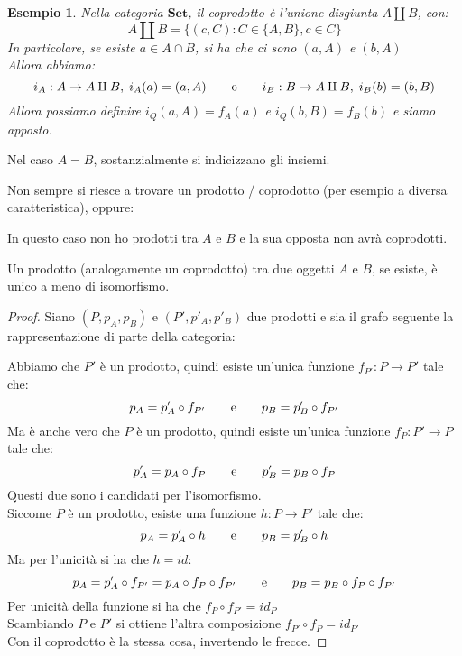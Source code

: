 \documentclass[11pt,a4paper,twoside]{article}
\newtheorem{es}{Esempio}
\theoremstyle{definition}
\begin{document}
\begin{es}
	Nella categoria $\bm{Set}$, il coprodotto è l'unione disgiunta $A \amalg B$, con:
	\[ A \amalg B = \{(c, C):C \in \{A, B\}, c \in C\} \]
	In particolare, se esiste $a \in A \cap B$, si ha che ci sono $(a, A)$ e $(b, A)$\\
	Allora abbiamo:
	\[ i_A : A \to A \amalg B,\; i_A(a) = (a, A)\qquad \text e \qquad i_B:B \to A \amalg B,\; i_B(b) = (b, B)\]
	Allora possiamo definire $i_Q(a, A) = f_A(a)$ e $i_Q(b, B) = f_B(b)$ e siamo apposto.
\end{es}
Nel caso $A = B$, sostanzialmente si indicizzano gli insiemi.

Non sempre si riesce a trovare un prodotto / coprodotto (per esempio a diversa caratteristica), oppure:
\begin{center}
\end{center}
In questo caso non ho prodotti tra $A$ e $B$ e la sua opposta non avrà coprodotti.

\begin{prop}{}{}
	Un prodotto (analogamente un coprodotto) tra due oggetti $A$ e $B$, se esiste, è unico a meno di isomorfismo.
\end{prop}

\begin{proof}
	Siano $(P, p_A, p_B)$ e $(P', p'_A, p'_B)$ due prodotti e sia il grafo seguente la rappresentazione di parte della categoria:
	\begin{center}
	\end{center}
	Abbiamo che $P'$ è un prodotto, quindi esiste un'unica funzione $f_{P'} : P \to P'$ tale che:
	\[ p_A = p_A' \circ f_{P'}\qquad \text e \qquad p_B = p_B' \circ f_{P'} \]
	Ma è anche vero che $P$ è un prodotto, quindi esiste un'unica funzione $f_P:P' \to P$ tale che:
	\[ p_A' = p_A \circ f_P \qquad \text e \qquad p_B' = p_B \circ f_P\]
	Questi due sono i candidati per l'isomorfismo.\\
	Siccome $P$ è un prodotto, esiste una funzione $h:P \to P'$ tale che:
	\[ p_A = p_A' \circ h \qquad \text e \qquad p_B = p_B' \circ h \]
	Ma per l'unicità si ha che $h = id$:
	\[ p_A = p_A' \circ f_{P'} = p_A \circ f_P \circ f_{P'}\qquad \text e \qquad p_B = p_B \circ f_P \circ f_{P'} \]
	Per unicità della funzione si ha che $f_P \circ f_{P'} = id_P$\\
	Scambiando $P$ e $P'$ si ottiene l'altra composizione $f_{P'} \circ f_P = id_{P'}$\\
	Con il coprodotto è la stessa cosa, invertendo le frecce.
\end{proof}
\end{document}
